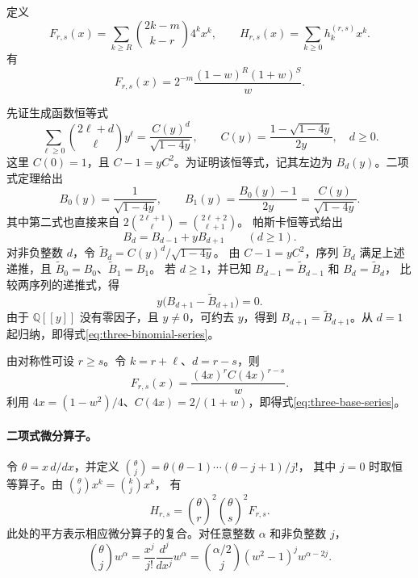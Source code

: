 \documentclass[a4paper,11pt]{article}
\numberwithin{equation}{section}
\theoremstyle{chinese}
\newcommand{\Q}{\mathbb Q}
\begin{document}
定义
\[
F_{r,s}(x)=\sum_{k\ge R}\binom{2k-m}{k-r}4^kx^k,
\qquad
H_{r,s}(x)=\sum_{k\ge0}h_k^{(r,s)}x^k.
\]
有
\begin{equation}
F_{r,s}(x)=2^{-m}\frac{(1-w)^R(1+w)^S}{w}.
\label{eq:three-base-series}
\end{equation}

先证生成函数恒等式
\begin{equation}
\sum_{\ell\ge0}\binom{2\ell+d}{\ell}y^\ell
=\frac{C(y)^d}{\sqrt{1-4y}},
\qquad
C(y)=\frac{1-\sqrt{1-4y}}{2y},\quad d\ge0.
\label{eq:three-binomial-series}
\end{equation}
这里 \(C(0)=1\)，且 \(C-1=yC^2\)。为证明该恒等式，记其左边为
\(B_d(y)\)。二项式定理给出
\[
B_0(y)=\frac{1}{\sqrt{1-4y}},
\qquad
B_1(y)=\frac{B_0(y)-1}{2y}
=\frac{C(y)}{\sqrt{1-4y}}.
\]
其中第二式也直接来自
\(2\binom{2\ell+1}{\ell}=\binom{2\ell+2}{\ell+1}\)。
帕斯卡恒等式给出
\[
B_d=B_{d-1}+yB_{d+1}\qquad(d\ge1).
\]
对非负整数 $d$，令 $\widetilde B_d=C(y)^d/\sqrt{1-4y}$。
由 $C-1=yC^2$，序列 $\widetilde B_d$ 满足上述递推，且
$\widetilde B_0=B_0$、$\widetilde B_1=B_1$。
若 $d\ge1$，并已知 $B_{d-1}=\widetilde B_{d-1}$ 和 $B_d=\widetilde B_d$，
比较两序列的递推式，得
\[
y\bigl(B_{d+1}-\widetilde B_{d+1}\bigr)=0.
\]
由于 $\Q[[y]]$ 没有零因子，且 $y\ne0$，可约去 $y$，得到
$B_{d+1}=\widetilde B_{d+1}$。从 $d=1$ 起归纳，即得式\eqref{eq:three-binomial-series}。

由对称性可设 \(r\ge s\)。令 \(k=r+\ell\)、\(d=r-s\)，则
\[
F_{r,s}(x)=\frac{(4x)^r C(4x)^{r-s}}{w}.
\]
利用 \(4x=(1-w^2)/4\)、\(C(4x)=2/(1+w)\)，即得式\eqref{eq:three-base-series}。

\paragraph{二项式微分算子。}

令 \(\theta=x\,d/dx\)，并定义
\(\binom{\theta}{j}=\theta(\theta-1)\cdots(\theta-j+1)/j!\)，
其中 \(j=0\) 时取恒等算子。由 \(\binom{\theta}{j}x^k=\binom{k}{j}x^k\)，
有
\begin{equation}
H_{r,s}=\binom{\theta}{r}^{\!2}\binom{\theta}{s}^{\!2}F_{r,s}.
\label{eq:three-operators}
\end{equation}
此处的平方表示相应微分算子的复合。对任意整数 \(\alpha\) 和非负整数 \(j\)，
\begin{equation}
\binom{\theta}{j}w^\alpha
=\frac{x^j}{j!}\frac{d^j}{dx^j}w^\alpha
=\binom{\alpha/2}{j}(w^2-1)^j w^{\alpha-2j}.
\label{eq:three-operator-power}
\end{equation}
\end{document}
